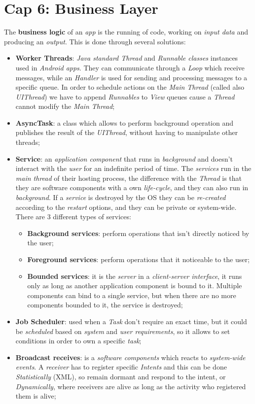 \documentclass{article}
\begin{document}
\section{Cap 6: Business Layer}
The \textbf{business logic} of an \emph{app} is the running of code, working on \emph{input data} and producing an \emph{output}. This is done through several solutions:
\begin{itemize}
\item \textbf{Worker Threads}: \emph{Java standard Thread} and \emph{Runnable classes} instances used in \emph{Android apps}. They can communicate through a \emph{Loop} which receive messages, while an \emph{Handler} is used for sending and processing messages to a specific queue. In order to schedule actions on the \emph{Main Thread} (called also \emph{UIThread}) we have to append \emph{Runnables} to \emph{View} queues cause a \emph{Thread} cannot modify the \emph{Main Thread};
\item \textbf{AsyncTask}: a class which allows to perform background operation and publishes the result of the \emph{UIThread}, without having to manipulate other threads;
\item \textbf{Service}: an \emph{application component} that runs in \emph{background} and doesn't interact with the \emph{user} for an indefinite period of time. The \emph{services} run in the \emph{main thread} of their hosting process, the difference with the \emph{Thread} is that they are software components with a own \emph{life-cycle}, and they can also run in \emph{background}. If a \emph{service} is destroyed by the OS they can be \emph{re-created} according to the \emph{restart} options, and they can be private or system-wide. There are 3 different types of services:
\begin{itemize}
\item \textbf{Background services}: perform operations that isn't directly noticed by the user;
\item \textbf{Foreground services}: perform operations that it noticeable to the user;
\item \textbf{Bounded services}: it is the \emph{server} in a \emph{client-server interface}, it runs only as long as another application component is bound to it. Multiple components can bind to a single service, but when there are no more components bounded to it, the service is destroyed;
\end{itemize}
\item \textbf{Job Scheduler}: used when a \emph{Task} don't require an exact time, but it could be \emph{scheduled} based on \emph{system} and \emph{user requirements}, so it allows to set conditions in order to own a specific \emph{task};
\item \textbf{Broadcast receives}: is a \emph{software components} which reacts to \emph{system-wide events}. A \emph{receiver} has to register specific \emph{Intents} and this can be done \emph{Statistically} (XML), so remain dormant and respond to the intent, or \emph{Dynamically}, where receivers are alive as long as the activity who registered them is alive;
\end{itemize}
\end{document}
